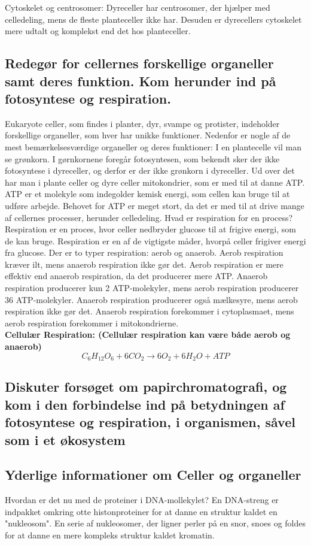             Cytoskelet og centrosomer: Dyreceller har centrosomer, der hjælper med celledeling, mens de fleste planteceller ikke har. Desuden er dyrecellers cytoskelet mere udtalt og komplekst end det hos planteceller.

    \subsection*{Redegør for cellernes forskellige organeller samt deres funktion. Kom herunder ind på fotosyntese og respiration.}
    Eukaryote celler, som findes i planter, dyr, svampe og protister, indeholder forskellige organeller, som hver har unikke funktioner. Nedenfor er nogle af de mest bemærkelsesværdige organeller og deres funktioner:
    I en plantecelle vil man se grønkorn. I gørnkornene foregår fotosyntesen, som bekendt sker der ikke fotosyntese i dyreceller, og derfor er der ikke grønkorn i dyreceller. Ud over det har man i plante celler og dyre celler mitokondrier, som er med til at danne ATP. ATP er et molekyle som indegolder kemisk energi, som cellen kan bruge til at udføre arbejde. Behovet for ATP er meget stort, da det er med til at drive mange af cellernes processer, herunder celledeling.
    Hvad er respiration for en process? Respiration er en proces, hvor celler nedbryder glucose til at frigive energi, som de kan bruge. Respiration er en af de vigtigste måder, hvorpå celler frigiver energi fra glucose. Der er to typer respiration: aerob og anaerob. 
    Aerob respiration kræver ilt, mens anaerob respiration ikke gør det. Aerob respiration er mere effektiv end anaerob respiration, da det producerer mere ATP. Anaerob respiration producerer kun 2 ATP-molekyler, mens aerob respiration producerer 36 ATP-molekyler. Anaerob respiration producerer også mælkesyre, mens aerob respiration ikke gør det. Anaerob respiration forekommer i cytoplasmaet, mens aerob respiration forekommer i mitokondrierne. \\
    \textbf{Cellulær Respiration: (Cellulær respiration kan være både aerob og anaerob) }\begin{equation}C_6H_{12}O_6 + 6CO_2 \rightarrow 6O_2 + 6H_2O + ATP \end{equation}


    \subsection*{Diskuter forsøget om papirchromatografi, og kom i den forbindelse ind på betydningen af fotosyntese og respiration, i organismen, såvel som i et økosystem}

    \subsection*{Yderlige informationer om Celler og organeller}
    Hvordan er det nu med de proteiner i DNA-mollekylet? \label{sec:protein} En DNA-streng er indpakket omkring otte histonproteiner for at danne en struktur kaldet en "nukleosom". En serie af nukleosomer, der ligner perler på en snor, snoes og foldes for at danne en mere kompleks struktur kaldet kromatin. 
